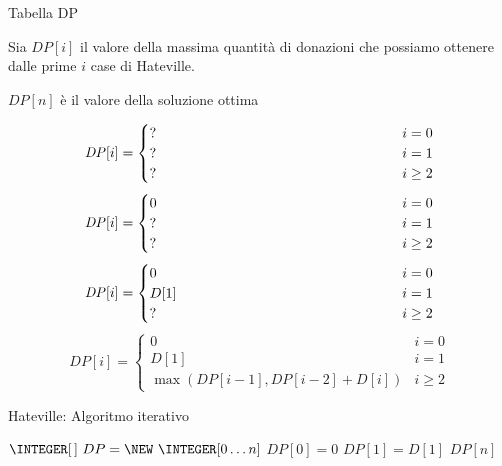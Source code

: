\begin{frame}{Tabella DP}

\vspace{-9pt}
\begin{myboxtitle}
\BIL
\item Sia $\mathit{DP}[i]$ il \alert{valore} della massima quantità di donazioni che possiamo
ottenere dalle prime $i$ case di Hateville. 
\item $\mathit{DP}[n]$ è il valore della soluzione ottima
\EIL
\end{myboxtitle}

\begin{overprint}
\[
  \mathit{DP}[i] =
  \begin{cases}
   \makebox[6cm][l]{?} & i = 0 \\
   \makebox[6cm][l]{?} & i = 1 \\
   \makebox[6cm][l]{?} & i \geq 2 
   \end{cases}
\]
\[
  \mathit{DP}[i] =
  \begin{cases}
   0 & i = 0 \\
  \makebox[6cm][l]{?} & i = 1 \\
  \makebox[6cm][l]{?} & i \geq 2 
   \end{cases}
\]
\[
  \mathit{DP}[i] =
  \begin{cases}
   0 & i = 0 \\
   D[1] & i = 1 \\
  \makebox[6cm][l]{?} & i \geq 2 
   \end{cases}
\]
\[
  \mathit{DP}[i] =
  \begin{cases}
   0 & i = 0 \\
   D[1] & i = 1 \\
   \max(\mathit{DP}[i-1], \mathit{DP}[i-2] + D[i]) & i \geq 2 
   \end{cases}
\]
\end{overprint}

\end{frame}

\begin{frame}{Hateville: Algoritmo iterativo}

\vspace{-9pt}

\pause
\begin{Procedure}
\caption[A]{\INTEGER\ \textsf{hateville}($\INTEGER[\,]\ D$, \INTEGER $n$)}
$\INTEGER[\,]\ DP = \NEW\ \INTEGER[0 \ldots n]$\;
$\mathit{DP}[0] = 0$\;
$\mathit{DP}[1] = D[1]$\;
\Return $\mathit{DP}[n]$\;
\end{Procedure}

\end{frame}

